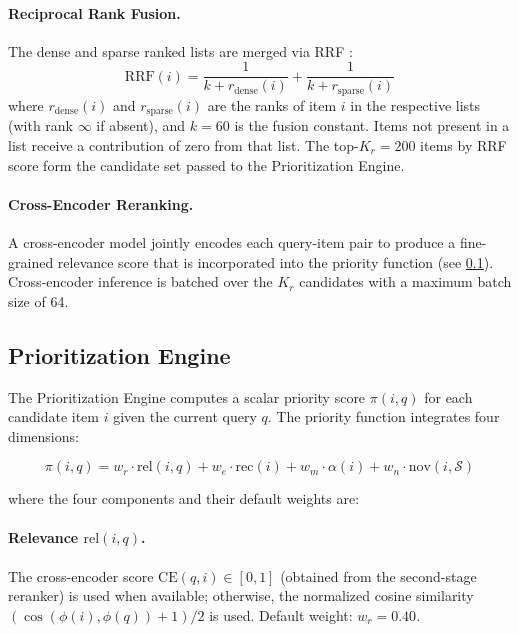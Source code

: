 \documentclass[review,12pt]{elsarticle}
\newcommand{\prio}{\pi}
\newcommand{\rel}{\mathrm{rel}}
\newcommand{\rec}{\mathrm{rec}}
\newcommand{\nov}{\mathrm{nov}}
\begin{document}
\paragraph{Reciprocal Rank Fusion.}
The dense and sparse ranked lists are merged via RRF \citep{cormack2009rrf}:
\begin{equation}
  \text{RRF}(i) =
  \frac{1}{k + r_{\text{dense}}(i)} + \frac{1}{k + r_{\text{sparse}}(i)}
  \label{eq:rrf}
\end{equation}
where $r_{\text{dense}}(i)$ and $r_{\text{sparse}}(i)$ are the ranks of item $i$
in the respective lists (with rank $\infty$ if absent), and $k = 60$ is the
fusion constant.  Items not present in a list receive a contribution of zero
from that list.  The top-$K_r = 200$ items by RRF score form the candidate set
passed to the Prioritization Engine.

\paragraph{Cross-Encoder Reranking.}
A cross-encoder model jointly encodes each query-item pair to produce a
fine-grained relevance score that is incorporated into the priority function
(see \cref{subsec:prioritization}).  Cross-encoder inference is batched over
the $K_r$ candidates with a maximum batch size of 64.

\subsection{Prioritization Engine}
\label{subsec:prioritization}

The Prioritization Engine computes a scalar priority score $\prio(i, q)$ for
each candidate item $i$ given the current query $q$.  The priority function
integrates four dimensions:

\begin{equation}
  \prio(i, q) =
    w_r \cdot \rel(i, q)
  + w_e \cdot \rec(i)
  + w_m \cdot \alpha(i)
  + w_n \cdot \nov(i, \mathcal{S})
  \label{eq:priority}
\end{equation}

\noindent where the four components and their default weights are:

\paragraph{Relevance $\rel(i, q)$.}
The cross-encoder score $\text{CE}(q, i) \in [0, 1]$ (obtained from the
second-stage reranker) is used when available; otherwise, the normalized
cosine similarity $(\cos(\phi(i), \phi(q)) + 1) / 2$ is used.
Default weight: $w_r = 0.40$.
\end{document}
